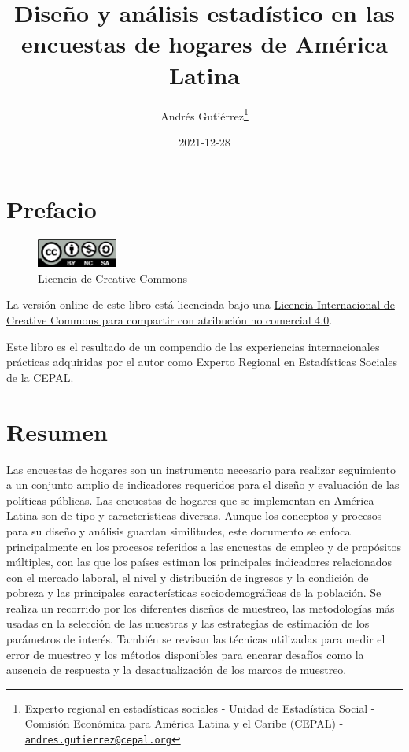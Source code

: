 \documentclass[
  12pt,
  spanish,
]{book}
\title{Diseño y análisis estadístico en las encuestas de hogares de América Latina}
\author{Andrés Gutiérrez\footnote{Experto regional en estadísticas sociales - Unidad de Estadística Social - Comisión Económica para América Latina y el Caribe (CEPAL) - \href{mailto:andres.gutierrez@cepal.org}{\nolinkurl{andres.gutierrez@cepal.org}}}}
\date{2021-12-28}
\begin{document}
\maketitle

{
\hypersetup{linkcolor=}
\setcounter{tocdepth}{1}
\tableofcontents
}
\listoftables
\listoffigures
\hypertarget{prefacio}{%
\chapter*{Prefacio}\label{prefacio}}

\begin{figure}
\includegraphics[width=100px]{Pics/CClicence} \caption{Licencia de Creative Commons}\label{fig:unnamed-chunk-1}
\end{figure}

La versión online de este libro está licenciada bajo una \href{http://creativecommons.org/licenses/by-nc-sa/4.0/}{Licencia Internacional de Creative Commons para compartir con atribución no comercial 4.0}.

Este libro es el resultado de un compendio de las experiencias internacionales prácticas adquiridas por el autor como Experto Regional en Estadísticas Sociales de la CEPAL.

\hypertarget{resumen}{%
\chapter*{Resumen}\label{resumen}}

Las encuestas de hogares son un instrumento necesario para realizar seguimiento a un conjunto amplio de indicadores requeridos para el diseño y evaluación de las políticas públicas. Las encuestas de hogares que se implementan en América Latina son de tipo y características diversas. Aunque los conceptos y procesos para su diseño y análisis guardan similitudes, este documento se enfoca principalmente en los procesos referidos a las encuestas de empleo y de propósitos múltiples, con las que los países estiman los principales indicadores relacionados con el mercado laboral, el nivel y distribución de ingresos y la condición de pobreza y las principales características sociodemográficas de la población. Se realiza un recorrido por los diferentes diseños de muestreo, las metodologías más usadas en la selección de las muestras y las estrategias de estimación de los parámetros de interés. También se revisan las técnicas utilizadas para medir el error de muestreo y los métodos disponibles para encarar desafíos como la ausencia de respuesta y la desactualización de los marcos de muestreo.
\end{document}
